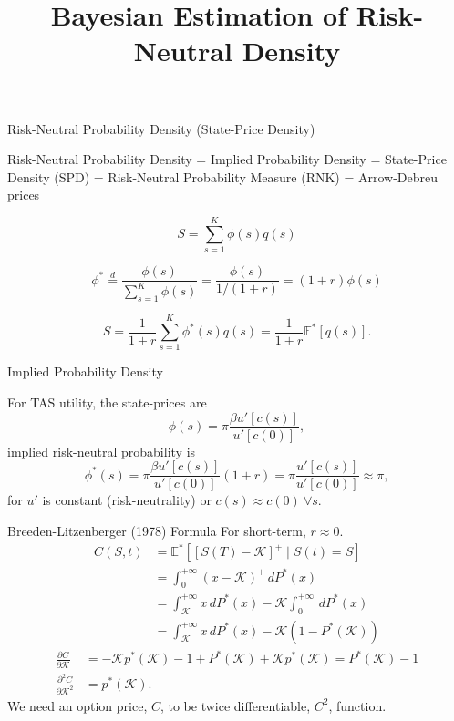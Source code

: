 \documentclass[10pt,aspectratio=43]{beamer}
\title{Bayesian Estimation of Risk-Neutral Density}
\begin{document}
\begin{frame}[fragile]
    \titlepage
\end{frame}





\begin{frame}{ Risk-Neutral Probability Density (State-Price Density)}

Risk-Neutral Probability Density = Implied Probability Density = State-Price Density (SPD) = Risk-Neutral Probability Measure (RNK) = Arrow-Debreu prices

    \[S=\sum_{s=1}^K\phi(s)q(s)\]

    

    \[\phi^*\overset{d}{=}\frac{\phi(s)}{\sum_{s=1}^K\phi(s)}=\frac{\phi(s)}{1/(1+r)}=(1+r)\phi(s)\]

    \[S=\frac{1}{1+r}\sum_{s=1}^K\phi^*(s)q(s)=\frac{1}{1+r}\mathbb{E}^*[q(s)].\]

\end{frame}
\begin{frame}{Implied  Probability Density}
 
    For TAS utility, the state-prices are 
    \[\phi(s)=\pi\frac{\beta u'[c(s)]}{u'[c(0)]},\]
    \then implied risk-neutral probability is
    \[\phi^*(s)=\pi\frac{\beta u'[c(s)]}{u'[c(0)]}(1+r)= \pi\frac{u'[c(s)]}{u'[c(0)]}\approx \pi,\]
    for $u'$ is constant (risk-neutrality) or $c(s)\approx c(0)~\forall s$.


\end{frame}




\begin{frame}{Breeden-Litzenberger (1978) Formula}
\nocite{breedenPricesStateContingentClaims1978}
For short-term, $r\approx 0$.
    \begin{align*}
        C(S,t)&=\mathbb{E}^*\left[[S(T)-\mathcal{K}]^+\mid S(t)=S\right]\\ 
        &=\int_0^{+\infty}(x-\mathcal{K})^+\,dP^*(x)\\ &=\int_{\mathcal{K}}^{+\infty}x\,dP^*(x)-\mathcal{K}\int_0^{+\infty}\,dP^*(x)\\ 
        &=\int_{\mathcal{K}}^{+\infty}x\,dP^*(x)-\mathcal{K}(1-P^*(\mathcal{K}))
    \end{align*}
    \begin{align*}
        \frac{\partial C}{\partial \mathcal{K}}&=-\mathcal{K}p^*(\mathcal{K})-1+P^*(\mathcal{K})+\mathcal{K}p^*(\mathcal{K})=P^*(\mathcal{K})-1\\ 
        \frac{\partial^2 C}{\partial \mathcal{K}^2}&=p^*(\mathcal{K}).
    \end{align*}
   We need an option price, $C$, to be twice differentiable, $C^2$, function. 
\end{frame}
\end{document}

